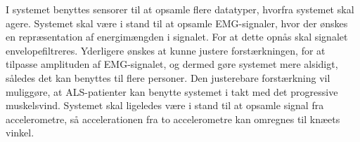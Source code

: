 I systemet benyttes sensorer til at opsamle flere datatyper, hvorfra systemet skal agere. Systemet skal være i stand til at opsamle EMG-signaler, hvor der ønskes en repræsentation af energimængden i signalet. For at dette opnås skal signalet envelopefiltreres. Yderligere ønskes at kunne justere forstærkningen, for at tilpasse amplituden af EMG-signalet, og dermed gøre systemet mere alsidigt, således det kan benyttes til flere personer. Den justerebare forstærkning vil muliggøre, at ALS-patienter kan benytte systemet i takt med det progressive muskelsvind.
Systemet skal ligeledes være i stand til at opsamle signal fra accelerometre, så accelerationen fra to accelerometre kan omregnes til knæets vinkel.